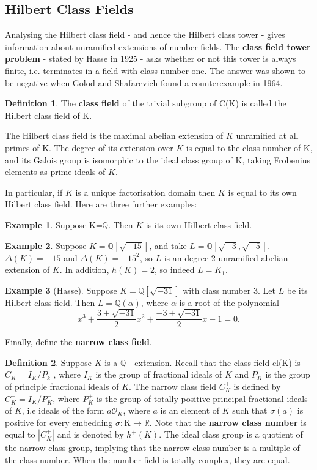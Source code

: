 \documentclass[12pt]{extarticle}
\newcommand{\Q}{\mathbb{Q}}
\newcommand{\<}{\langle}
\renewcommand{\>}{\rangle}
\theoremstyle{definition}
\newtheorem*{definition}{Definition}
\newtheorem*{example}{Example}
\begin{document}
\subsection{Hilbert Class Fields}
Analysing the Hilbert class field - and hence the Hilbert class tower - gives information about unramified extensions of number fields. The \textbf{class
field tower problem} - stated by Hasse in 1925 -  asks whether or not this tower is always finite, i.e. terminates in a field with class number one. The answer was shown to be negative when
Golod and Shafarevich found a counterexample in 1964. 
\begin{definition}
The \textbf{class field} of the trivial subgroup of C(K) is called the Hilbert class field of K. 
\end{definition}
The Hilbert class field is the maximal abelian extension of $K$ unramified at all primes of K. The degree of its extension over $K$ is equal to the class number of K, and its Galois group is isomorphic to the ideal class group of K, taking Frobenius elements as prime ideals of $K$. \par
In particular, if $K$ is a unique factorisation domain then $K$ is equal to its own Hilbert class field. 
Here are three further examples:
\begin{example}
    Suppose K=$\mathbb{Q}$. Then $K$ is its own Hilbert class field. 
\end{example}
\begin{example}
    Suppose $K=\mathbb{Q}[\sqrt{-15}]$, and take $L=\Q[\sqrt{-3},\sqrt{-5}]$.  $\Delta(K) = -15$ and $\Delta(K) = -15^2$, so $L$ is an degree 2 unramified abelian extension of $K$. In addition, $h(K)=2$, so indeed $L=K_1$.  
\end{example}
\begin{example}[Hasse]
    Suppose $K=\mathbb{Q}[\sqrt{-31}]$ with class number 3. Let $L$ be its Hilbert class field. Then $L = \Q(\alpha)$, where $\alpha$ is a root of the polynomial 
    \begin{equation}
        x^3+\frac{3+\sqrt{-31}}{2}x^2+\frac{-3+\sqrt{-31}}{2}x -1 =0.
    \end{equation}
\end{example}

Finally, define the \textbf{narrow class field}.
\begin{definition}
Suppose $K$ is a $\Q$ - extension. Recall that the class field cl(K) is $C_K = I_K/P_k$ , where $I_K$ is the group of fractional ideals of $K$ and $P_K$ is the group of principle fractional ideals of $K$. The narrow class field $C_K^{+}$ is defined by $C_K^{+} = I_K/P_K^{+}$, where $P_K^{+}$ is the group of totally positive principal fractional ideals of $K$, i.e ideals of the form $a\mathcal{O}_K$, where $a$ is an element of $K$ such that $\sigma(a)$ is positive for every embedding $\sigma: $K$ \rightarrow \mathbb{R}$. 
Note that the \textbf{narrow class number} is equal to $|C_K^{+}|$ and is denoted by $h^{+}(K)$. 
  The ideal class group is a quotient of the narrow class group, implying that the narrow class number is a multiple of the class number. When the number field is totally complex, they are equal. 


\end{definition}
\end{document}
